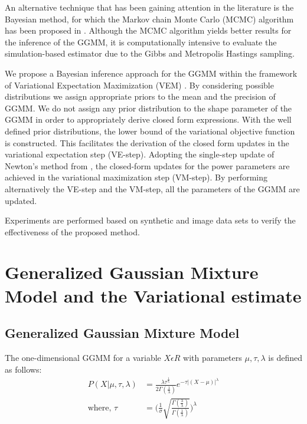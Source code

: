 \documentclass[conference]{IEEEtran}
\begin{document}
An alternative technique that has been gaining attention in the literature is the Bayesian method, for which the Markov chain Monte Carlo (MCMC) algorithm has been proposed in \cite{nb1}. Although the MCMC algorithm yields better results for the inference of the GGMM, it is computationally intensive to evaluate the simulation-based estimator due to the Gibbs and Metropolis Hastings sampling.

We propose a Bayesian inference approach for the GGMM within the framework of Variational Expectation Maximization (VEM) \cite{g1}. By considering possible distributions we assign appropriate priors to the mean and the precision of GGMM. We do not assign any prior distribution to the shape parameter of the GGMM in order to appropriately derive closed form expressions. 
With the well defined prior distributions, the lower bound of the variational objective function is constructed. This facilitates the derivation of the closed form updates in the variational expectation step (VE-step).
Adopting the single-step update of Newton's method from \cite{g2}, the closed-form updates for the power parameters are achieved in the variational maximization step (VM-step).
By performing alternatively the VE-step and the VM-step, all the parameters of the GGMM are updated.

Experiments are performed based on synthetic and image data sets to verify the effectiveness of the proposed method.


\section{Generalized Gaussian Mixture Model and the Variational estimate}

\subsection{Generalized Gaussian Mixture Model}
The one-dimensional GGMM for a variable $X \epsilon R $ with parameters $\mu, \tau, \lambda$ is defined as follows:
\begin{equation*}
    \begin{split}
        P(X|\mu, \tau, \lambda) &= \frac{\lambda  \tau^\frac{1}{\lambda}}{2\Gamma(\frac{1}{\lambda})}
          e^{-\tau  |(X-\mu)|^{\lambda}}    \\
          \text{where, }
        \tau &= \Bigg({\frac{1}{\sigma} \sqrt{\frac{\Gamma(\frac{3}{\lambda})}{\Gamma(\frac{1}{\lambda})}}}\Bigg)^\lambda
    \end{split}
    \end{equation*}
\end{document}
